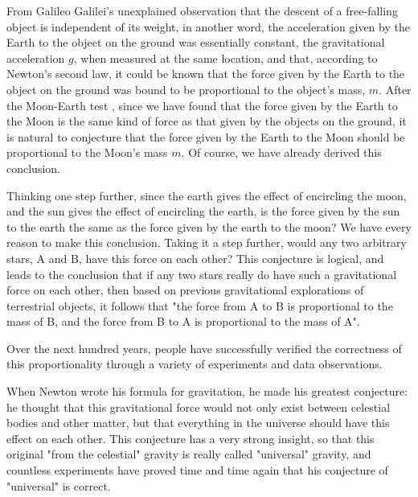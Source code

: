 \documentclass{article}
\begin{document}
From Galileo Galilei's unexplained observation that the descent of a free-falling object is independent of its weight, in another word, the acceleration given by the Earth to the object on the ground was essentially constant, the gravitational acceleration $g$, when measured at the same location, and that, according to Newton's second law, it could be known that the force given by the Earth to the object on the ground was bound to be proportional to the object's mass, $m$. After the Moon-Earth test \autocite{French1971}, since we have found that the force given by the Earth to the Moon is the same kind of force as that given by the objects on the ground, it is natural to conjecture that the force given by the Earth to the Moon should be proportional to the Moon's mass $m$. Of course, we have already derived this conclusion.

Thinking one step further, since the earth gives the effect of encircling the moon, and the sun gives the effect of encircling the earth, is the force given by the sun to the earth the same as the force given by the earth to the moon? We have every reason to make this conclusion. Taking it a step further, would any two arbitrary stars, A and B, have this force on each other? This conjecture is logical, and leads to the conclusion that if any two stars really do have such a gravitational force on each other, then based on previous gravitational explorations of terrestrial objects, it follows that "the force from A to B is proportional to the mass of B, and the force from B to A is proportional to the mass of A". 


Over the next hundred years, people have successfully verified the correctness of this proportionality through a variety of experiments and data observations.

When Newton wrote his formula for gravitation, he made his greatest conjecture: he thought that this gravitational force would not only exist between celestial bodies and other matter, but that everything in the universe should have this effect on each other. This conjecture has a very strong insight, so that this original "from the celestial" gravity is really called "universal" gravity, and countless experiments have proved time and time again that his conjecture of "universal" is correct.
\end{document}

